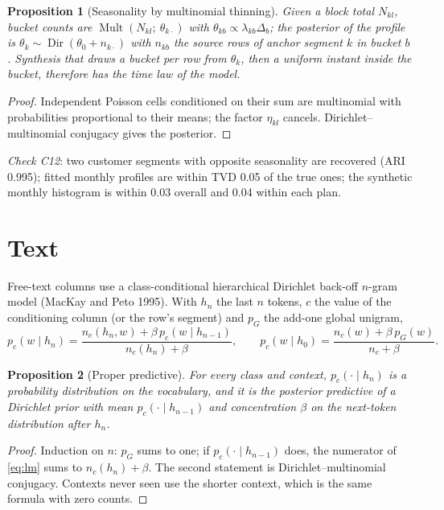 \documentclass[11pt,a4paper]{article}
\newtheorem{proposition}{Proposition}
\theoremstyle{definition}
\theoremstyle{remark}
\newcommand{\Dir}{\operatorname{Dir}}
\newcommand{\Mult}{\operatorname{Mult}}
\begin{document}
\begin{proposition}[Seasonality by multinomial thinning]\label{prop:time}
Given a block total $N_{kl}$, bucket counts are $\Mult(N_{kl};\ \theta_{k\cdot})$ with $\theta_{kb}\propto\lambda_{kb}\Delta_b$; the posterior of the profile is $\theta_k\sim\Dir(\theta_0+n_{k\cdot})$ with $n_{kb}$ the source rows of anchor segment $k$ in bucket $b$. Synthesis that draws a bucket per row from $\theta_k$, then a uniform instant inside the bucket, therefore has the time law of the model.
\end{proposition}
\begin{proof}
Independent Poisson cells conditioned on their sum are multinomial with probabilities proportional to their means; the factor $\eta_{kl}$ cancels. Dirichlet--multinomial conjugacy gives the posterior.
\end{proof}
\noindent\emph{Check C12}: two customer segments with opposite seasonality are recovered (ARI 0.995); fitted monthly profiles are within TVD 0.05 of the true ones; the synthetic monthly histogram is within 0.03 overall and 0.04 within each plan.

\section{Text}\label{sec:text}
Free-text columns use a class-conditional hierarchical Dirichlet back-off $n$-gram model (MacKay and Peto 1995). With $h_n$ the last $n$ tokens, $c$ the value of the conditioning column (or the row's segment) and $p_G$ the add-one global unigram,
\begin{equation}\label{eq:lm}
p_c(w\mid h_n)=\frac{n_c(h_n,w)+\beta\,p_c(w\mid h_{n-1})}{n_c(h_n)+\beta},\qquad p_c(w\mid h_0)=\frac{n_c(w)+\beta\,p_G(w)}{n_c+\beta}.
\end{equation}

\begin{proposition}[Proper predictive]\label{prop:lm}
For every class and context, $p_c(\cdot\mid h_n)$ is a probability distribution on the vocabulary, and it is the posterior predictive of a Dirichlet prior with mean $p_c(\cdot\mid h_{n-1})$ and concentration $\beta$ on the next-token distribution after $h_n$.
\end{proposition}
\begin{proof}
Induction on $n$: $p_G$ sums to one; if $p_c(\cdot\mid h_{n-1})$ does, the numerator of \eqref{eq:lm} sums to $n_c(h_n)+\beta$. The second statement is Dirichlet--multinomial conjugacy. Contexts never seen use the shorter context, which is the same formula with zero counts.
\end{proof}
\end{document}
